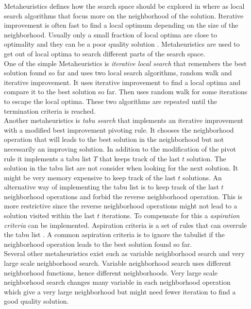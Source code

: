 Metaheuristics defines how the search space should be explored in where as local search algorithms that focus more on 
the neighborhood of the solution. Iterative improvement is often fast to find a local optimum depending on the size of 
the neighborhood. Usually only a small fraction of local optima are close to optimality and they can be a poor quality 
solution \cite[p.135]{lsbog}. Metaheuristics are used to get out of local optima to search different parts of the 
search space. \\
One of the simple Metaheuristics is \emph{iterative local search} that remembers the best solution 
found so far and uses two local search algorithms, random walk and iterative improvement. It uses iterative improvement 
to find a local optima and compare it to the best solution so far. Then uses random walk for some iterations to escape 
the local optima. These two algorithms are repeated until the termination criteria is reached. \\ 
Another metaheuristics is \emph{tabu search} that implements an iterative improvement with a modified best improvement 
pivoting rule. It chooses the neighborhood operation that will leads to the best solution in the neighborhood but not 
necessarily an improving solution. In addition to the modification of the pivot rule it implements a tabu list $T$ that 
keeps track of the last $t$ solution. The solution in the tabu list are not consider when looking for the next 
solution. It might be very memory expensive to keep track of the last $t$ solutions. An alternative way of implementing 
the tabu list is to keep track of the last $t$ neighborhood operations and forbid the reverse neighborhood operation. 
This is more restrictive since the reverse neighborhood operations might not lead to a solution visited within 
the last $t$ iterations. To compensate for this a \emph{aspiration criteria} can be implemented. Aspiration criteria is 
a set of rules that can overrule the tabu list \cite[p.139-140]{lsbog}. A common aspiration criteria is to ignore the 
tabulist if the neighborhood operation leads to the best solution found so far. \\
Several other metaheuristics exist such as variable neighborhood search and very large scale neighborhood search. 
Variable neighborhood search uses different neighborhood functions, hence different neighborhoods. Very large scale 
neighborhood search changes many variable in each neighborhood operation which give a very large neighborhood but might 
need fewer iteration to find a good quality solution. 